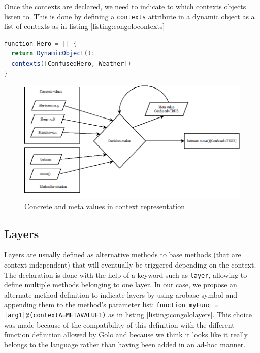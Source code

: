 \documentclass[a4paper]{article}
\begin{document}
Once the contexts are declared, we need to indicate to which contexts objects listen to. This is done by defining a \lstinline|contexts| attribute in a dynamic object as a list of contexts as in listing \ref{listing:congolocontexts}

\begin{lstlisting}[float, language=Java, caption=ConGolo object's contexts, label={listing:congolocontexts}]
function Hero = || {
  return DynamicObject():
  contexts([ConfusedHero, Weather])
}
\end{lstlisting}


\begin{center}
\begin{figure}
\centering
\includegraphics[width=0.9\columnwidth]{images/concrete-meta-values.png}
\caption{Concrete and meta values in context representation}
\label{figure:concretemetavalues}
\end{figure}
\end{center}

\subsection{Layers}
\label{subsection:layers}
Layers are usually defined as alternative methods to base methods (that are context independent) that will eventually be triggered depending on the context. The declaration is done with the help of a keyword such as \lstinline|layer|, allowing to define multiple methods belonging to one layer. In our case, we propose an alternate method definition to indicate layers by using arobase symbol and appending them to the method's parameter list: \lstinline!function myFunc = |arg1|@(contextA=METAVALUE1)! as in listing \ref{listing:congololayers}. This choice was made because of the compatibility of this definition with the different function definition allowed by Golo and because we think it looks like it really belongs to the language rather than having been added in an ad-hoc manner.
\end{document}
